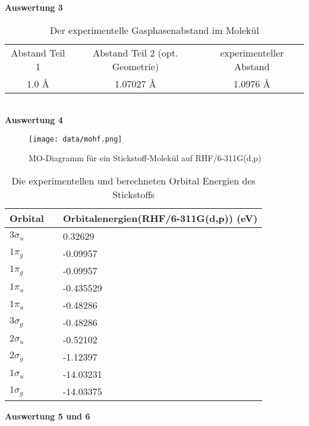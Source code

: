 \documentclass[12pt]{article}
\begin{document}
\begin{onehalfspace}
\textbf{Auswertung 3}\\
\begin{table}[!htpb]
\centering
\caption{Der experimentelle Gasphasenabstand im  Molekül }
\begin{tabular}{ccc}
\toprule
Abstand Teil 1 & Abstand Teil 2 (opt. Geometrie)  & experimenteller Abstand \\
1.0 \si{\angstrom} & 1.07027 \si{\angstrom} & 1.0976 \si{\angstrom} \\
\midrule
\bottomrule
\end{tabular}
\end{table}\\
\noindent
\textbf{Auswertung 4}\\
\begin{figure}[!htpb]
   \centering
\texttt{[image: data/mohf.png]}
\caption{MO-Diagramm für ein Stickstoff-Molekül auf RHF/6-311G(d,p)}
\end{figure}

\begin{table}[!htpb]
\centering
\caption{Die experimentellen und berechneten Orbital Energien des Stickstoffs}
\begin{tabular}{lll}
\toprule
Orbital  && Orbitalenergien(RHF/6-311G(d,p)) (eV)\\
\midrule
$3\sigma _u$ & &   0.32629\\
$1\pi _g$    & &    -0.09957 \\
$1\pi _g$    & &   -0.09957 \\
$1\pi _u$    &  &  -0.435529 \\
$1\pi _u$    & &  -0.48286 \\
$3\sigma _g$ &  & -0.48286 \\
$2\sigma _u$ && -0.52102 \\
$2\sigma _g$ & & -1.12397 \\
$1\sigma _u$ &  &-14.03231 \\
$1\sigma _g$ & &-14.03375 \\
\bottomrule
\end{tabular}
\end{table}

\textbf{Auswertung 5 und 6}
\begin{figure}[!hptb]
    \centering
    \begin{subfigure}[b]{0.4\textwidth}
    \end{subfigure}
    \begin{subfigure}[b]{0.4\textwidth}
    \end{subfigure}


\end{figure}
\end{onehalfspace}
\end{document}
